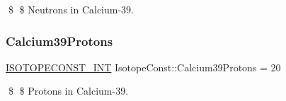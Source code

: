 \$ \$ Neutrons in Calcium-\/39. \mbox{\label{group___isotope_const-_calcium-_ca39_ga93c5ced625130b626bb22a6d84181834}} 
\subsubsection{\texorpdfstring{Calcium39\+Protons}{Calcium39Protons}}
{\footnotesize\ttfamily \mbox{\hyperlink{group___isotope_const-_macros_ga5f18360b3e99483a35c32d789e62621c}{I\+S\+O\+T\+O\+P\+E\+C\+O\+N\+S\+T\+\_\+\+I\+NT}} Isotope\+Const\+::\+Calcium39\+Protons = 20}

\$ \$ Protons in Calcium-\/39. 